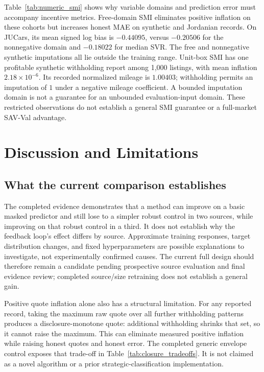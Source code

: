 Table~\ref{tab:numeric_smi} shows why variable domains and prediction
error must accompany incentive metrics. Free-domain SMI eliminates
positive inflation on these cohorts but increases honest MAE on
synthetic and Jordanian records. On JUCars, its mean signed log bias is
$-0.44095$, versus $-0.20506$ for the nonnegative domain and $-0.18022$
for median SVR. The free and nonnegative synthetic imputations all lie
outside the training range. Unit-box SMI has one profitable synthetic
withholding report among 1,000 listings, with mean inflation
$2.18\times10^{-6}$. Its recorded normalized mileage is $1.00403$;
withholding permits an imputation of $1$ under a negative mileage
coefficient. A bounded imputation domain is not a guarantee
for an unbounded evaluation-input domain. These restricted observations
do not establish a general SMI guarantee or a full-market SAV-Val
advantage.










\section{Discussion and Limitations}
\subsection{What the current comparison establishes}
The completed evidence demonstrates that a method can improve on a basic
masked predictor and still lose to a simpler robust control in two sources,
while improving on that robust control in a third. It does not establish
why the feedback loop's effect differs by source. Approximate training
responses, target distribution changes, and fixed hyperparameters are
possible explanations to investigate, not experimentally confirmed
causes. The current full design should therefore remain a candidate
pending prospective source evaluation and final evidence review; completed
source/size retraining does not establish a general gain.

Positive quote inflation alone also has a structural limitation. For
any reported record, taking the maximum raw quote over all further
withholding patterns produces a disclosure-monotone quote: additional
withholding shrinks that set, so it cannot raise the maximum. This can
eliminate measured positive inflation while raising honest quotes and
honest error. The completed generic envelope control exposes that
trade-off in Table~\ref{tab:closure_tradeoffs}. It is not claimed as a
novel algorithm or a prior strategic-classification implementation.


